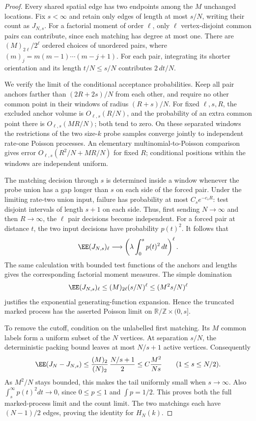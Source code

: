 \documentclass[11pt,letterpaper]{article}
\newcommand{\T}{\mathbb R/\mathbb Z}\newcommand{\Leb}{\operatorname{Leb}}
\begin{document}
\begin{proof}
Every shared spatial edge has two endpoints among the $M$
unchanged locations. Fix $s<\infty$ and retain only edges of
length at most $s/N$, writing their count as $J_{N,s}$.
For a factorial moment of order $\ell$, only $\ell$ vertex-disjoint
common pairs can contribute, since each matching has degree at
most one. There are $(M)_{2\ell}/2^\ell$ ordered choices of
unordered pairs, where $(m)_j=m(m-1)\cdots(m-j+1)$.
For each pair, integrating its shorter orientation and its
length $t/N\le s/N$ contributes $2\,dt/N$.

We verify the limit of the conditional acceptance probabilities.
Keep all pair anchors farther than $(2R+2s)/N$ from each other,
and require no other common point in their windows of radius
$(R+s)/N$. For fixed $\ell,s,R$, the excluded anchor volume
is $O_{\ell,s}(R/N)$, and the probability of an extra common
point there is $O_{\ell,s}(MR/N)$; both tend to zero.
On these separated windows the restrictions of the two size-$k$
probe samples converge jointly to independent rate-one Poisson
processes. An elementary multinomial-to-Poisson comparison
gives error $O_{\ell,s}(R^2/N+MR/N)$ for fixed $R$;
conditional positions within the windows are independent uniform.

The matching decision through $s$ is determined inside a
window whenever the probe union has a gap longer than $s$
on each side of the forced pair. Under the limiting rate-two
union input, failure has probability at most $C_se^{-c_sR}$:
test disjoint intervals of length $s+1$ on each side.
Thus, first sending $N\to\infty$ and then $R\to\infty$, the
$\ell$ pair decisions become independent. For a forced pair
at distance $t$, the two input decisions have probability
$p(t)^2$. It follows that
\begin{equation}\label{eq:endpoint-factorial-moments}
 \EE(J_{N,s})_\ell
       \longrightarrow
       \left(\lambda\int_0^s p(t)^2\,dt\right)^\ell.
\end{equation}
The same calculation with bounded test functions of the
anchors and lengths gives the corresponding factorial
moment measures. The simple domination
\[
 \EE(J_{N,s})_\ell
       \le (M)_{2\ell}(s/N)^\ell
       \le (M^2s/N)^\ell
\]
justifies the exponential generating-function expansion.
Hence the truncated marked process has the asserted Poisson
limit on $\T\times(0,s]$.

To remove the cutoff, condition on the unlabelled first
matching. Its $M$ common labels form a uniform subset of
the $N$ vertices. At separation $s/N$, the deterministic
packing bound leaves at most $N/s+1$ active vertices.
Consequently
\[
 \EE(J_N-J_{N,s})
 \le \frac{(M)_2}{(N)_2}\,\frac{N/s+1}{2}
 \le C\frac{M^2}{Ns}
 \qquad(1\le s\le N/2).
\]
As $M^2/N$ stays bounded, this makes the tail uniformly
small when $s\to\infty$. Also $\int_s^\infty p(t)^2dt\to0$,
since $0\le p\le1$ and $\int p=1/2$.
This proves both the full marked-process limit and the count limit.
The two matchings each have $(N-1)/2$ edges, proving the
identity for $H_N(k)$.


\end{proof}
\end{document}
